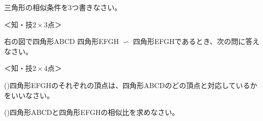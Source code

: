 \documentclass[
  12pt,a4paper,lualatex,ja=standard]{bxjsarticle}
\begin{document}
\pagestyle{plain}

\begin{flushleft}

\noindent{} \hspace{1pt}三角形の相似条件を3つ書きなさい。

%
\begin{flushright}%
\footnotesize{＜知・技$2\times 3$点＞}%
\end{flushright}%


\vspace{10mm}

\begin{multicols}{2}
\noindent{} \hspace{1pt}右の図で四角形ABCD 四角形EFGH $\mathrel{\text{∽}}$ 四角形EFGHであるとき、次の問に答えなさい。

%
\begin{flushright}%
\footnotesize{＜知・技$2\times 4$点＞}%
\end{flushright}%


()\hspace{2.5pt}四角形EFGHのそれぞれの頂点は、四角形ABCDのどの頂点と対応しているかをいいなさい。

\vspace{15mm}

()\hspace{2.5pt}四角形ABCDと四角形EFGHの相似比を求めなさい。

\vspace{15mm}

\columnbreak


\end{multicols}
\end{flushleft}
\end{document}
